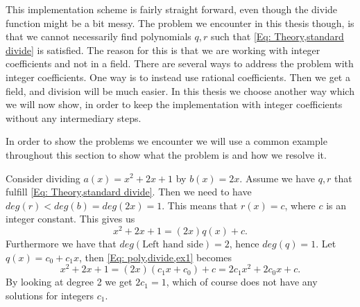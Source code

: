This implementation scheme is fairly straight forward, even though the divide function might be a bit messy. The problem we encounter in this thesis though, is that we cannot necessarily find polynomials $q,r$ such that \eqref{Eq: Theory,standard divide} is satisfied. The reason for this is that we are working with integer coefficients and not in a field. There are several ways to address the problem with integer coefficients. One way is to instead use rational coefficients. Then we get a field, and division will be much easier. In this thesis we choose another way which we will now show, in order to keep the implementation with integer coefficients without any intermediary steps.

In order to show the problems we encounter we will use a common example throughout this section to show what the problem is and how we resolve it.
\begin{example}
  Consider dividing $a(x)=x^2+2x+1$ by $b(x)=2x$. Assume we have $q,r$ that fulfill \eqref{Eq: Theory,standard divide}. Then we need to have $deg(r)<deg(b)=deg(2x)=1$. This means that $r(x)=c$, where $c$ is an integer constant. This gives us
  \begin{equation}\label{Eq: poly,divide,ex1}
    x^2+2x+1=(2x)q(x)+c.
  \end{equation}
  Furthermore we have that $deg(\text{Left hand side})=2$, hence $deg(q)=1$. Let $q(x)=c_0+c_1x$, then \eqref{Eq: poly,divide,ex1} becomes
  \begin{equation}
    x^2+2x+1=(2x)(c_1x+c_0)+c=2c_1x^2+2c_0x+c.
  \end{equation}
  By looking at degree 2 we get $2c_1=1$, which of course does not have any solutions for integers $c_1$.
\end{example}

